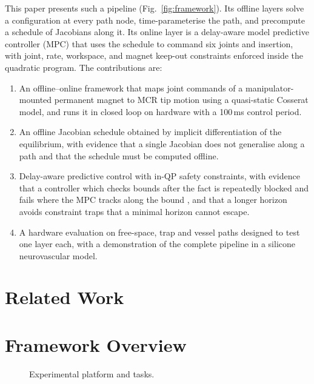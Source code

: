 \documentclass[journal]{IEEEtran}
\newcommand{\figph}[3]{%
  \fbox{\parbox[c][#2][c]{\dimexpr#1-2\fboxsep-2\fboxrule\relax}{%
  \centering\footnotesize\textcolor{gray}{\textbf{Figure placeholder}}\\[2pt]
  \parbox{0.9\linewidth}{\centering\footnotesize\textcolor{gray}{#3}}}}}
\begin{document}
This paper presents such a pipeline (Fig.~\ref{fig:framework}). Its
offline layers solve a configuration at every path node, time-parameterise
the path, and precompute a schedule of Jacobians along it. Its online layer
is a delay-aware model predictive controller (MPC) that uses the schedule
to command six joints and insertion, with joint, rate, workspace, and
magnet keep-out constraints enforced inside the quadratic program. The
contributions are:
\begin{enumerate}
\item An offline--online framework that maps joint commands of a
manipulator-mounted permanent magnet to MCR tip motion using a
quasi-static Cosserat model, and runs it in closed loop on hardware with
a 100\,ms control period.
\item An offline Jacobian schedule obtained by implicit differentiation of
the equilibrium, with evidence that a single Jacobian does not generalise
along a path and that the schedule must be computed offline.
\item Delay-aware predictive control with in-QP safety constraints, with
evidence that a controller which checks bounds after the fact is
repeatedly blocked and fails where the MPC tracks along the bound
, and that a longer horizon avoids constraint traps that a
minimal horizon cannot escape.
\item A hardware evaluation on free-space, trap and vessel paths designed
to test one layer each, with a
demonstration of the complete pipeline in a silicone neurovascular model.
\end{enumerate}

\section{Related Work}
\label{sec:related}


\section{Framework Overview}
\label{sec:framework}

\begin{figure}[t]
\centering
\figph{\textwidth}{5.0cm}{(a) Platform: UR10e with cylindrical N52
permanent magnet, MCR and insertion advancer, overhead camera,
robot-base frame $\mathcal F_R$, and the 235\,mm magnet keep-out sphere
about the insertion point drawn to scale. (b) Vessel phantom with
centerline and segment C. (c) Rectangle, the three triangles with the height band and keep-out sphere.
(d) MCR cross-section and marker layout. }
\caption{Experimental platform and tasks.}
\label{fig:setup}
\end{figure}
\end{document}
